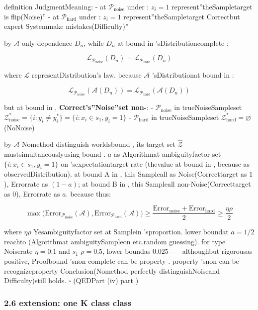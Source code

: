 \documentclass[
  12pt,
]{article}
\begin{document}
definition JudgmentMeaning:  - at  \(\mathcal{P}_{\text{noise}}\) under : \(z_i = 1\)
represent''theSampletarget is flip(Noise)'' - at  \(\mathcal{P}_{\text{hard}}\)
under : \(z_i = 1\) represent''theSampletarget Correctbut expert Systemmake mistakes(Difficulty)''

by  \(\mathcal{A}\) only dependence \(D_n\), while  \(D_n\)
at bound in 'sDistributioncomplete : 

\[\mathcal{L}_{\mathcal{P}_{\text{noise}}}(D_n) = \mathcal{L}_{\mathcal{P}_{\text{hard}}}(D_n)\]

where \(\mathcal{L}\) representDistribution's law. because  \(\mathcal{A}\)
'sDistributionat bound in : 

\[\mathcal{L}_{\mathcal{P}_{\text{noise}}}(\mathcal{A}(D_n)) = \mathcal{L}_{\mathcal{P}_{\text{hard}}}(\mathcal{A}(D_n))\]

but at bound in , \textbf{Correct's''Noise''set non-}:  -
\(\mathcal{P}_{\text{noise}}\) in trueNoiseSampleset 
\(\mathcal{Z}_{\text{noise}}^* = \{i: y_i \neq y_i^*\} = \{i: x_i \in s_1, y_i = 1\}\)
- \(\mathcal{P}_{\text{hard}}\) in trueNoiseSampleset 
\(\mathcal{Z}_{\text{hard}}^* = \varnothing\)(NoNoise)

by  \(\mathcal{A}\) Nomethod distinguish worldsbound , its target set  \(\hat{\mathcal{Z}}\)
mustsimultaneouslyusing bound .  \(a\) as Algorithmat ambiguityfactor set 
\(\{i: x_i \in s_1, y_i = 1\}\)
on 'sexpectationtarget rate (thevalue at bound in , because as observedDistribution). at bound  A
in , this Sampleall as Noise(Correcttarget as  \(1\)), Errorrate as  \((1-a)\); at bound  B
in , this Sampleall non-Noise(Correcttarget as  \(0\)), Errorrate as  \(a\). because thus: 

\[\max\bigl(\text{Error}_{\mathcal{P}_{\text{noise}}}(\mathcal{A}), \text{Error}_{\mathcal{P}_{\text{hard}}}(\mathcal{A})\bigr) \geq \frac{\text{Error}_{\text{noise}} + \text{Error}_{\text{hard}}}{2} \geq \frac{\eta\rho}{2}\]

where \(\eta\rho\) Yesambiguityfactor set at Samplein 'sproportion. lower boundat  \(a = 1/2\)
reachto (Algorithmat ambiguitySampleon etc.random guessing). for type Noiserate  \(\eta = 0.1\)
and  \(s_1\)  \(\rho = 0.5\), lower boundas 
\(0.025\)------althoughbut rigorousas positive, Proofbound 'snon-complete can be property . property 'snon-can be recognizeproperty Conclusion(Nomethod perfectly distinguishNoiseand Difficulty)still holds. \(\square\)
(QEDPart (iv) part )

\subsubsection{2.6 extension: one  K
class class }\label{ux6269ux5c55ux4e00ux822c-k-ux7c7bux5206ux7c7b}
\end{document}
